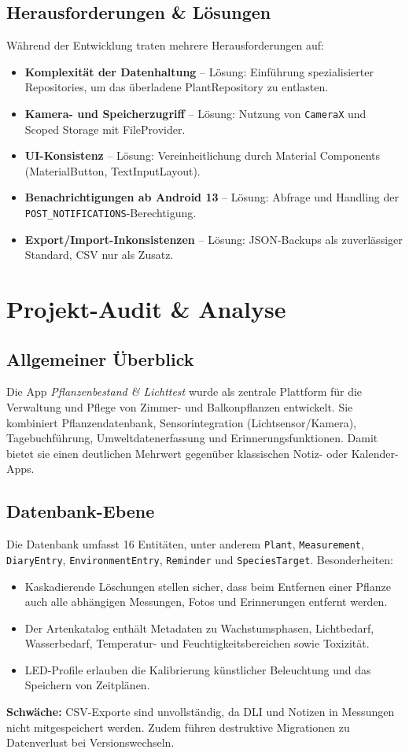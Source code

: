 \documentclass[14pt,a4paper]{report}
\begin{document}
\section{Herausforderungen \& Lösungen}
Während der Entwicklung traten mehrere Herausforderungen auf:
\begin{itemize}
    \item \textbf{Komplexität der Datenhaltung} – Lösung: Einführung spezialisierter Repositories, um das überladene PlantRepository zu entlasten.
    \item \textbf{Kamera- und Speicherzugriff} – Lösung: Nutzung von \texttt{CameraX} und Scoped Storage mit FileProvider.
    \item \textbf{UI-Konsistenz} – Lösung: Vereinheitlichung durch Material Components (MaterialButton, TextInputLayout).
    \item \textbf{Benachrichtigungen ab Android 13} – Lösung: Abfrage und Handling der \texttt{POST\_NOTIFICATIONS}-Berechtigung.
    \item \textbf{Export/Import-Inkonsistenzen} – Lösung: JSON-Backups als zuverlässiger Standard, CSV nur als Zusatz.
\end{itemize}


\chapter{Projekt-Audit \& Analyse}

\section{Allgemeiner Überblick}
Die App \textit{Pflanzenbestand \& Lichttest} wurde als zentrale Plattform für die Verwaltung und Pflege von Zimmer- und Balkonpflanzen entwickelt. 
Sie kombiniert Pflanzendatenbank, Sensorintegration (Lichtsensor/Kamera), Tagebuchführung, Umweltdatenerfassung und Erinnerungsfunktionen. 
Damit bietet sie einen deutlichen Mehrwert gegenüber klassischen Notiz- oder Kalender-Apps.

\section{Datenbank-Ebene}
Die Datenbank umfasst 16 Entitäten, unter anderem \texttt{Plant}, \texttt{Measurement}, \texttt{DiaryEntry}, \texttt{EnvironmentEntry}, \texttt{Reminder} und \texttt{SpeciesTarget}. 
Besonderheiten:
\begin{itemize}
    \item Kaskadierende Löschungen stellen sicher, dass beim Entfernen einer Pflanze auch alle abhängigen Messungen, Fotos und Erinnerungen entfernt werden.
    \item Der Artenkatalog enthält Metadaten zu Wachstumsphasen, Lichtbedarf, Wasserbedarf, Temperatur- und Feuchtigkeitsbereichen sowie Toxizität.
    \item LED-Profile erlauben die Kalibrierung künstlicher Beleuchtung und das Speichern von Zeitplänen.
\end{itemize}
\textbf{Schwäche:} CSV-Exporte sind unvollständig, da DLI und Notizen in Messungen nicht mitgespeichert werden. Zudem führen destruktive Migrationen zu Datenverlust bei Versionswechseln.
\end{document}
